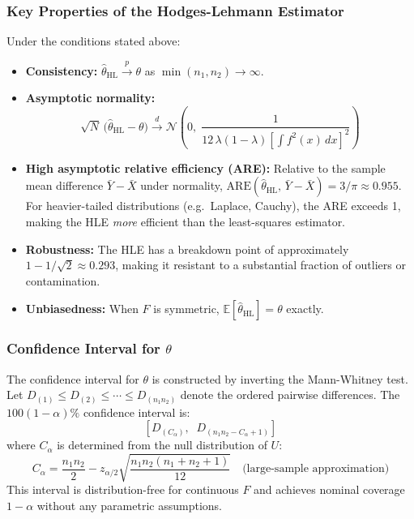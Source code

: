 \documentclass[10pt]{article}
\begin{document}
\subsubsection{Key Properties of the Hodges-Lehmann Estimator}

Under the conditions stated above:

\begin{itemize}
    \item \textbf{Consistency:} $\widehat{\theta}_{\mathrm{HL}} \overset{p}{\to} \theta$ as $\min(n_1, n_2) \to \infty$.

    \item \textbf{Asymptotic normality:}
    \[
    \sqrt{N}\,\bigl(\widehat{\theta}_{\mathrm{HL}} - \theta\bigr) \overset{d}{\longrightarrow} \mathcal{N}\!\left(0,\;\frac{1}{12\,\lambda(1-\lambda)\left[\int f^2(x)\,dx\right]^2}\right)
    \]

    \item \textbf{High asymptotic relative efficiency (ARE):} Relative to the sample mean difference $\bar{Y} - \bar{X}$ under normality, $\mathrm{ARE}(\widehat{\theta}_{\mathrm{HL}},\, \bar{Y}-\bar{X}) = 3/\pi \approx 0.955$. For heavier-tailed distributions (e.g.\ Laplace, Cauchy), the ARE exceeds 1, making the HLE \textit{more} efficient than the least-squares estimator.

    \item \textbf{Robustness:} The HLE has a breakdown point of approximately $1 - 1/\sqrt{2} \approx 0.293$, making it resistant to a substantial fraction of outliers or contamination.

    \item \textbf{Unbiasedness:} When $F$ is symmetric, $\mathbb{E}[\widehat{\theta}_{\mathrm{HL}}] = \theta$ exactly.
\end{itemize}

\subsubsection{Confidence Interval for $\theta$}

The confidence interval for $\theta$ is constructed by inverting the Mann-Whitney test. Let $D_{(1)} \leq D_{(2)} \leq \cdots \leq D_{(n_1 n_2)}$ denote the ordered pairwise differences. The $100(1-\alpha)\%$ confidence interval is:
\[
\left[D_{(C_\alpha)},\;\; D_{(n_1 n_2 - C_\alpha + 1)}\right]
\]
where $C_\alpha$ is determined from the null distribution of $U$:
\[
C_\alpha = \frac{n_1 n_2}{2} - z_{\alpha/2}\sqrt{\frac{n_1 n_2(n_1+n_2+1)}{12}} \quad \text{(large-sample approximation)}
\]
This interval is distribution-free for continuous $F$ and achieves nominal coverage $1-\alpha$ without any parametric assumptions.
\end{document}
